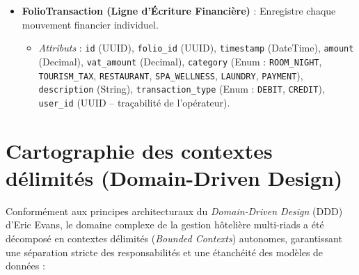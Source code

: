 \documentclass[12pt,a4paper,oneside]{report}
\begin{document}
\begin{itemize}
    \item \textbf{FolioTransaction (Ligne d'Écriture Financière)} : Enregistre chaque mouvement financier individuel.
    \begin{itemize}
        \item \textit{Attributs} : \texttt{id} (UUID), \texttt{folio\_id} (UUID), \texttt{timestamp} (DateTime), \texttt{amount} (Decimal), \texttt{vat\_amount} (Decimal), \texttt{category} (Enum : \texttt{ROOM\_NIGHT}, \texttt{TOURISM\_TAX}, \texttt{RESTAURANT}, \texttt{SPA\_WELLNESS}, \texttt{LAUNDRY}, \texttt{PAYMENT}), \texttt{description} (String), \texttt{transaction\_type} (Enum : \texttt{DEBIT}, \texttt{CREDIT}), \texttt{user\_id} (UUID -- traçabilité de l'opérateur).
    \end{itemize}
\end{itemize}

\section{Cartographie des contextes délimités (Domain-Driven Design)}

Conformément aux principes architecturaux du \textit{Domain-Driven Design} (DDD) d'Eric Evans, le domaine complexe de la gestion hôtelière multi-riads a été décomposé en contextes délimités (\textit{Bounded Contexts}) autonomes, garantissant une séparation stricte des responsabilités et une étanchéité des modèles de données :
\end{document}

